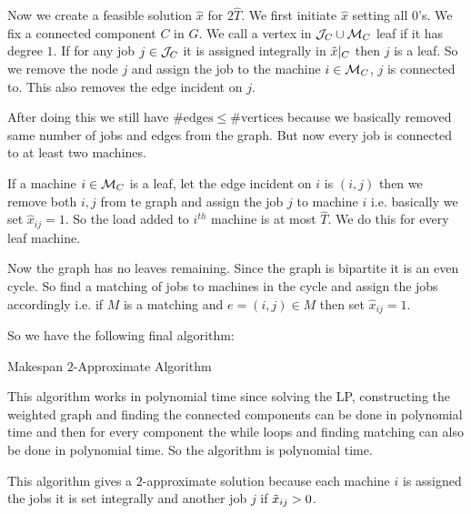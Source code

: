 Now we create a feasible solution $\hat{x}$ for $2\hat{T}$. We first initiate $\hat{x}$ setting all $0$'s. We fix a connected component $C$ in $G$. We call a vertex in $\mathcal{J}_C\cup \mathcal{M}_C$ leaf if it has degree $1$. If for any job $j\in \mathcal{J}_C$ it is assigned integrally in $\tilde{x}|_C$ then $j$ is a leaf. So we remove the node $j$ and assign the job to the machine $i\in \mathcal{M}_C$, $j$ is connected to.  This also removes the edge incident on $j$. 

After doing this we still have $\#\text{edges}\leq \#\text{vertices}$ because we basically removed same number of jobs and edges from the graph. But now every job is connected to at least two machines. 

If a machine $i\in\mathcal{M}_C$ is a leaf, let the edge incident on $i$ is $(i,j)$ then we remove both $i,j$ from te graph and assign the job $j$ to machine $i$ i.e. basically we set $\hat{x}_{ij}=1$. So the load added to $i^{th}$ machine is at most $\hat{T}$. We do this for every leaf machine.

Now the graph has no leaves remaining. Since the graph is bipartite it is an even cycle. So find a matching of jobs to machines in the cycle and assign the jobs accordingly i.e. if $M$ is a matching and $e=(i,j)\in M$ then set $\hat{x}_{ij}=1$.\newpage

So we have the following final algorithm:

\begin{algorithm}
\DontPrintSemicolon
{}
\caption{Makespan $2$-Approximate Algorithm}
\end{algorithm}

This algorithm works in polynomial time since solving the LP,  constructing the weighted graph and finding the connected components can be done in polynomial time and then for every component the while loops and finding matching can also be done in polynomial time. So the algorithm is polynomial time.

This algorithm gives a $2$-approximate solution because each machine $i$ is assigned the jobs it is set integrally and another job $j$ if $\tilde{x}_{ij}>0$. 